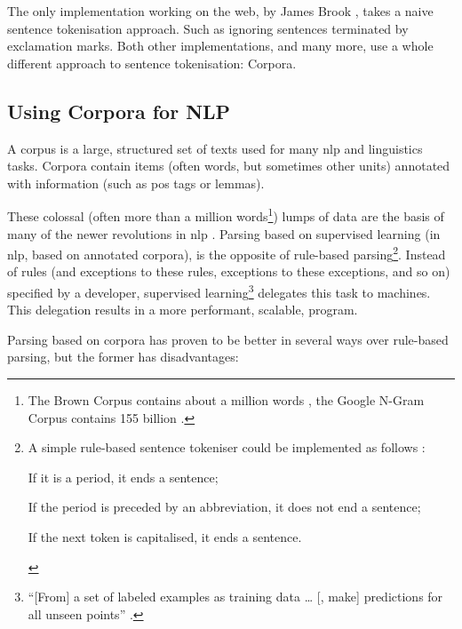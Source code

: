 The only implementation working on the web, by James Brook
  \autocite*{jbrooksuk/node-summary-source-code}, takes a naive sentence
  tokenisation approach.
Such as ignoring sentences terminated by exclamation marks.
Both other implementations, and many more, use a whole different approach to
  sentence tokenisation: Corpora.

\subsection{Using Corpora for NLP}\label{using-corpora-for}

A corpus is a large, structured set of texts used for many \gls{nlp}
  and linguistics tasks.
Corpora contain items (often words, but sometimes other units) annotated
  with information (such as \gls{pos} tags or lemmas).

These colossal (often more than a million words\footnote{The Brown Corpus
    contains about a million words \autocite{francis-nelson-brown-corpus},
    the Google N-Gram Corpus contains 155 billion
    \autocite{brants-thorsten-google-ngram-corpus}.})
  lumps of data are the basis of many of the newer revolutions in \gls{nlp}
  \autocite{mitkov-ruslan-ea-importance-corpora}.
Parsing based on supervised learning (in \gls{nlp}, based on annotated
  corpora), is the opposite of rule-based parsing\footnote{A simple
    rule-based sentence tokeniser could be implemented as follows
    \autocite{attivio.com-doing-things-with-sentences}:

    \begin{aenumerate}
      \item If it is a period, it ends a sentence;
      \item If the period is preceded by an abbreviation, it does not end
        a sentence;
      \item If the next token is capitalised, it ends a sentence.
    \end{aenumerate}}.
Instead of rules (and exceptions to these rules, exceptions to these
  exceptions, and so on) specified by a developer,
  supervised learning\footnote{``{[}From{]} a set of labeled examples as
    training data \ldots{} {[}, make{]} predictions for all unseen points''
    \autocite{mohri-mehryar-foundations-machine-learning}.}
  delegates this task to machines.
This delegation results in a more performant, scalable, program.

Parsing based on corpora has proven to be better in several ways over
  rule-based parsing, but the former has disadvantages:

